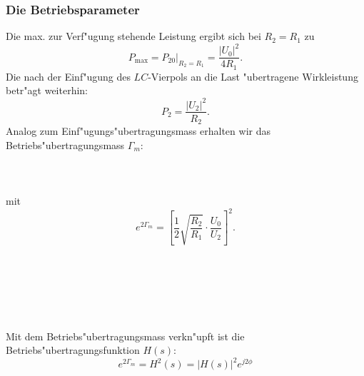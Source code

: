 \subsubsection{Die Betriebsparameter}
Die max. zur Verf"ugung stehende Leistung ergibt sich bei $R_2=R_1$ zu
\begin{equation*}
P_{\max}=\left. P_{20} \right|_{R_2=R_1}=\frac{|U_0|^2}{4 R_1}.
\end{equation*}
Die nach der Einf"ugung des $LC$-Vierpols an die Last
"ubertragene Wirkleistung betr"agt weiterhin:
\begin{equation*}
P_2=\frac{|U_2|^2}{R_2}.
\end{equation*}
Analog zum Einf"ugungs"ubertragungsmass erhalten wir das 
Be\-triebs\-"uber\-tra\-gungs\-mass $\Gamma_m$:\\~~\\
\\~~\\
mit
\begin{equation}
e^{2 \Gamma_m}=\left[ \frac{1}{2}
                        \sqrt{\frac{R_2}{R_1}}
                        \cdot \frac{U_0}{U_2} \right]^2.
\end{equation}\\~~\\
\\~~\\
\\~~\\
Mit dem Betriebs"ubertragungsmass
verkn"upft ist die Betriebs"ubertragungsfunktion $H(s)$:
\begin{equation}
e^{2 \Gamma_m}=H^2(s)=|H(s)|^2 e^{j 2 \phi}
\end{equation}\\
\\~~\\
